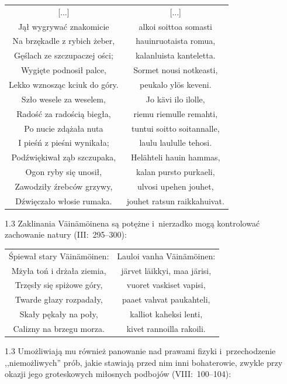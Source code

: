 \documentclass[11pt,a4paper,twoside]{report}
\begin{document}
{\centering
\small
\begin{longtable}{c c}
{[...]} & {[...]}\\
Jął wygrywać znakomicie & alkoi soittoa somasti\\
Na brzękadle z rybich żeber, & hauinruotaista romua,\\
Gęślach ze szczupaczej ości; & kalanluista kanteletta.\\
Wygięte podnosił palce, & Sormet nousi notkeasti,\\
Lekko wznosząc kciuk do góry. & peukalo ylös keveni.\\
Szło wesele za weselem, & Jo kävi ilo ilolle,\\
Radość za radością biegła, & riemu riemulle remahti,\\
Po nucie zdążała nuta & tuntui soitto soitannalle,\\
I pieśń z pieśni wynikała; & laulu laululle tehosi.\\
Podźwiękiwał ząb szczupaka, & Helähteli hauin hammas,\\
Ogon ryby się unosił, & kalan pursto purkaeli,\\
Zawodziły źrebców grzywy, & ulvosi upehen jouhet,\\
Dźwięczało włosie rumaka. & jouhet ratsun raikkahuivat.\\
\end{longtable}
}
\newpage
\begin{spacing}{1.3}
Zaklinania Väinämöinena są potężne i~nierzadko mogą kontrolować zachowanie natury (III:~295--300):
\end{spacing}
{\centering
\small
\begin{longtable}{c c}
Śpiewał stary Väinämöinen: & Lauloi vanha Väinämöinen:\\
Mżyła toń i drżała ziemia, & järvet läikkyi, maa järisi,\\
Trzęsły się spiżowe góry, & vuoret vaskiset vapisi,\\
Twarde głazy rozpadały, & paaet vahvat paukahteli,\\
Skały pękały na poły, & kalliot kaheksi lenti,\\
Calizny na brzegu morza. & kivet rannoilla rakoili.\\
\end{longtable}
}
\begin{spacing}{1.3}
Umożliwiają mu również panowanie nad prawami fizyki i~przechodzenie ,,niemożliwych'' prób, jakie stawiają przed nim inni bohaterowie, zwykle przy okazji jego groteskowych miłosnych podbojów (VIII:~100--104):
\end{spacing}
\end{document}
